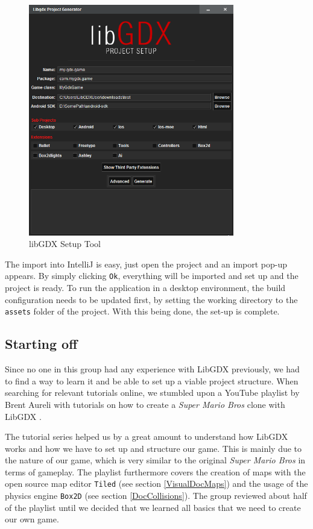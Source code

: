 \documentclass[12p]{article}
\begin{document}
\begin{figure}[ht]
  \centering
  \includegraphics[width=0.8\textwidth]{libGDX_setup.png}
  \caption{libGDX Setup Tool}
  \label{fig:LibGDXSetupScreenshot}
\end{figure}

The import into IntelliJ is easy, just open the project and an import pop-up appears. By simply clicking \texttt{Ok}, everything will be imported and set up and the project is ready. To run the application in a desktop environment, the build configuration needs to be updated first, by setting the working directory to the \texttt{assets} folder of the project. With this being done, the set-up is complete.


\newpage
\subsection{Starting off}

Since no one in this group had any experience with LibGDX previously, we had to find a way to learn it and be able to set up a viable project structure. When searching for relevant tutorials online, we stumbled upon a YouTube playlist by Brent Aureli with tutorials on how to create a \emph{Super Mario Bros} \cite{SuperMarioBros} clone with LibGDX \cite{BrentAureliSuperMarioBros}.

The tutorial series helped us by a great amount to understand how LibGDX works and how we have to set up and structure our game. This is mainly due to the nature of our game, which is very similar to the original \emph{Super Mario Bros} in terms of gameplay. The playlist furthermore covers the creation of maps with the open source map editor \texttt{Tiled} (see section \ref{VisualDocMaps}) and the usage of the physics engine \texttt{Box2D} (see section \ref{DocCollisions}). The group reviewed about half of the playlist until we decided that we learned all basics that we need to create our own game.
\end{document}
